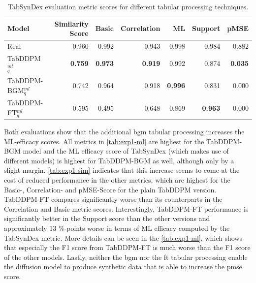 \begin{table}[h]
	\centering
	\begin{tabular}{lrrrrrr}
		\toprule
		\textbf{Model}         & \textbf{Similarity Score} & \textbf{Basic} & \textbf{Correlation} & \textbf{ML}    & \textbf{Support} & \textbf{pMSE}  \\
		\midrule
		Real                   & 0.960                     & 0.992          & 0.943                & 0.998          & 0.984            & 0.882          \\
		TabDDPM$^{ml}_{q}$     & \textbf{0.759}            & \textbf{0.973} & \textbf{0.919}       & 0.992          & 0.874            & \textbf{0.035} \\
		TabDDPM-BGM$^{ml}_{q}$ & 0.742                     & 0.964          & 0.918                & \textbf{0.996} & 0.831            & 0.000          \\
		TabDDPM-FT$^{ml}_{q}$  & 0.595                     & 0.495          & 0.648                & 0.869          & \textbf{0.963}   & 0.000          \\
		\bottomrule
	\end{tabular}
	\caption[Experiment 1 TabSynDex]{TabSynDex evaluation metric scores for different tabular processing techniques.}
	\label{tab:exp1-sim}
\end{table}

Both evaluations show that the additional \gls{bgm} tabular processing increases the ML-efficacy scores.
All metrics in \autoref{tab:exp1-ml} are highest for the TabDDPM-BGM model and the ML efficacy score of TabSynDex (which makes use of different models)
is highest for TabDDPM-BGM as well, although only by a slight margin.
\autoref{tab:exp1-sim} indicates that this increase seems to come at the cost of reduced performance in the other metrics, which are highest for the Basic-, Correlation- and pMSE-Score for the plain TabDDPM version.
TabDDPM-FT compares significantly worse than its counterparts in the Correlation and Basic metric scores.
Interestingly, TabDDPM-FT performance is significantly better in the Support score than the other versions and approximately 13 \%-points worse in terms of ML efficacy computed by the TabSynDex metric.
More details can be seen in the \autoref{tab:exp1-ml}, which shows that especially the F1 score from TabDDPM-FT is much worse than the F1 score of the other models.
Lastly, neither the \gls{bgm} nor the \gls{ft} tabular processing enable the diffusion model to produce synthetic data that is able to increase the \gls{pmse} score.


